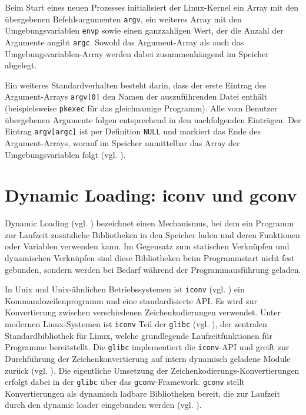 \documentclass[oneside,11pt,a4paper,article,german]{memoir}
\begin{document}
Beim Start eines neuen Prozesses initialisiert der Linux-Kernel ein Array mit den übergebenen Befehlsargumenten \texttt{argv},
ein weiteres Array mit den Umgebungsvariablen \texttt{envp} sowie einen ganzzahligen Wert, der die Anzahl der
Argumente angibt \texttt{argc}. Sowohl das Argument-Array als auch das Umgebungsvariablen-Array werden dabei zusammenhängend im
Speicher abgelegt.
\par
Ein weiteres Standardverhalten besteht darin, dass der erste Eintrag des Argument-Arrays
\texttt{argv[0]} den Namen der auszuführenden Datei enthält (beispielsweise \texttt{pkexec} für das gleichnamige Programm).
Alle vom Benutzer übergebenen Argumente folgen entsprechend in den nachfolgenden Einträgen.
Der Eintrag \texttt{argv[argc]} ist per Definition \texttt{NULL} und markiert das Ende des Argument-Arrays, worauf im Speicher
unmittelbar das Array der Umgebungsvariablen folgt (vgl. \cite{n5_redhat_RHSB-2022-001}).

\section{Dynamic Loading: iconv und gconv}

Dynamic Loading (vgl. \cite{c3_dynamic_loading_wikipedia}) bezeichnet einen Mechanismus, bei dem ein Programm zur Laufzeit zusätzliche Bibliotheken in den Speicher laden
und deren Funktionen oder Variablen verwenden kann. Im Gegensatz zum statischen Verknüpfen und dynamischen Verknüpfen sind diese Bibliotheken
beim Programmstart nicht fest gebunden, sondern werden bei Bedarf während der Programmausführung geladen.
\par
In Unix und Unix-ähnlichen Betriebssystemen ist \texttt{iconv} (vgl. \cite{c4_iconv}) ein Kommandozeilenprogramm und eine standardisierte API. Es wird zur Konvertierung
zwischen verschiedenen Zeichenkodierungen verwendet.
Unter modernen Linux-Systemen ist \texttt{iconv} Teil der \texttt{glibc} (vgl. \cite{c4_iconv, c5_gnu_c}), der zentralen Standardbibliothek für Linux, welche grundlegende
Laufzeitfunktionen für Programme bereitstellt. Die \texttt{glibc} implementiert die \texttt{iconv}-API und greift zur Durchführung der Zeichenkonvertierung
auf intern dynamisch geladene Module zurück (vgl. \cite{c6_glibc_gconv}).
Die eigentliche Umsetzung der Zeichenkodierungs-Konvertierungen erfolgt dabei in der \texttt{glibc} über das \texttt{gconv}-Framework.
\texttt{gconv} stellt Konvertierungen als dynamisch ladbare Bibliotheken bereit, die zur Laufzeit durch den dynamic loader eingebunden werden (vgl. \cite{c6_glibc_gconv}).
\par
\end{document}
